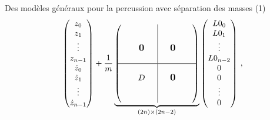 \begin{frame}{Des modèles généraux pour la percussion avec séparation des masses (1)}
\begin{align}
      \begin{pmatrix}
        z_0 \\ z_1 \\ \vdots \\ z_{n-1} \\ \dot z_0 \\ \dot z_1 \\ \vdots \\ \dot z_{n-1}
        \end{pmatrix}
    +
    \frac{1}{m} \underbrace{\begin{pmatrix}
        \begin{matrix}
       & & &  \\ & & &  \\ & & \bigzero & \\ & & & \\      
        \end{matrix}
        & \rvline 
        &     \begin{matrix}
            & & &  \\ & & &  \\ & \bigzero & & \\ & & & \\      
             \end{matrix}  \\ 
        \hline
        \begin{matrix}
            & & &  \\ & & D & \\ & & & \\ & & & \\     
        \end{matrix}
        & \rvline 
        &   \begin{matrix}
            & & &  \\ & \bigzero & &  \\ & &  & \\ & & & \\      
            \end{matrix}
      \end{pmatrix}}_{(2n) \times (2n-2)}
      \begin{pmatrix}
        L0_0 \\ L0_1 \\ \vdots \\ L0_{n-2} \\ 0 \\ 0 \\ \vdots \\ 0
        \end{pmatrix} \,,
	\end{align}
	

\end{frame}
